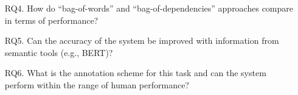 \documentclass[handout,xcolor={dvipsnames}]{beamer}
\begin{document}
\begin{frame}
\begin{itemize}
\pause
\vspace{1em}
\item[RQ4.]{How do ``bag-of-words'' and ``bag-of-dependencies'' approaches compare in terms of performance?}
\pause
\vspace{1em}
\item[RQ5.]{Can the accuracy of the system be improved with information from semantic tools (e.g., BERT)?}

\pause
\vspace{1em}
\item[RQ6.]{What is the annotation scheme for this task and can the system perform within the range of human performance?}
\end{itemize}
\end{frame}
\end{document}

